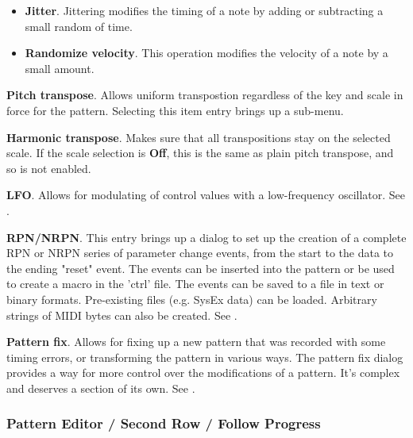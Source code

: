 \begin{enumber}
\begin{itemize}
            \item \textbf{Jitter}.
               Jittering modifies the timing of a note by adding or subtracting
               a small random of time.
            \item \textbf{Randomize velocity}.
               This operation modifies the velocity of a note by a small
               amount.
         \end{itemize}
      \item \textbf{Pitch transpose}.
         Allows uniform transpostion
         regardless of the key and scale in force for the pattern.
         Selecting this item entry brings up a sub-menu.
      \item \textbf{Harmonic transpose}.
         Makes sure
         that all transpositions stay on the selected scale.
         If the scale selection is \textbf{Off}, this is the same as plain
         pitch transpose, and so is not enabled.
      \item \textbf{LFO}.
         Allows for modulating of control values with a
         low-frequency oscillator.
         See .
      \item \textbf{RPN/NRPN}.
         This entry brings up a dialog to set up the creation of a complete RPN
         or NRPN series of parameter change events, from the start to the data
         to the ending "reset" event.
         The events can be inserted into the pattern or
         be used to create a macro in the 'ctrl' file.
         The events can be saved to a file in text or binary formats.
         Pre-existing files (e.g. SysEx data) can be loaded.
         Arbitrary strings of MIDI bytes can also be created.
         See .
      \item \textbf{Pattern fix}.
         Allows for fixing up a new pattern
         that was recorded with some timing errors, or transforming the
         pattern in various ways.
         The pattern fix dialog provides a way for more control over the
         modifications of a pattern.
         It's complex and deserves a section of its own.
         See .
   \end{enumber}

\subsubsection{Pattern Editor / Second Row / Follow Progress}
\label{subsubsec:pattern_editor_second_row_follow_progress}

